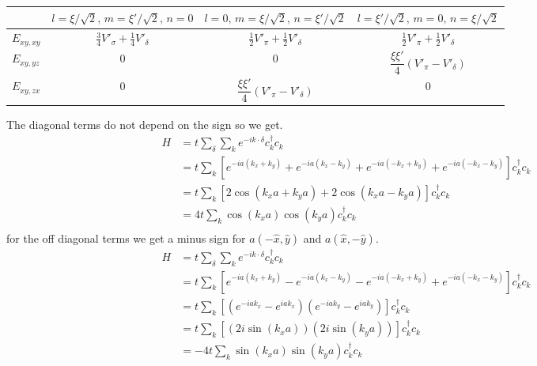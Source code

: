 \documentclass[11pt]{article}
\begin{document}
\begin{table}[h]
\centering
\begin{tabular}{lccc}
\toprule
 & $l=\xi/\sqrt{2},\,m=\xi'/\sqrt{2},\,n=0$
 & $l=0,\,m=\xi/\sqrt{2},\,n=\xi'/\sqrt{2}$
 & $l=\xi'/\sqrt{2},\,m=0,\,n=\xi/\sqrt{2}$ \\
\midrule
$E_{xy,xy}$ & $\tfrac{3}{4}V'_\sigma + \tfrac{1}{4}V'_\delta$
            & $\tfrac{1}{2}V'_\pi + \tfrac{1}{2}V'_\delta$
            & $\tfrac{1}{2}V'_\pi + \tfrac{1}{2}V'_\delta$ \\[6pt]
$E_{xy,yz}$ & $0$
            & $0$
            & $\dfrac{\xi\xi'}{4}\left(V'_\pi - V'_\delta\right)$ \\[8pt]
$E_{xy,zx}$ & $0$
            & $\dfrac{\xi\xi'}{4}\left(V'_\pi - V'_\delta\right)$
            & $0$ \\
\bottomrule
\end{tabular}
\end{table}

The diagonal terms do not depend on the sign so we get.
\begin{align}
    H &= t \sum_\delta \sum_k e^{-ik \cdot \delta} c_k^\dagger c_k \\\nonumber
    &= t \sum_k \left[e^{-ia(k_x+k_y)}+e^{-ia(k_x-k_y)}+e^{-ia(-k_x+k_y)} + e^{-ia(-k_x-k_y)}\right] c_k^\dagger c_k \\\nonumber
    &= t \sum_k \left[2\cos(k_xa + k_ya) + 2\cos(k_xa - k_ya)\right] c_k^\dagger c_k \\\nonumber
    &= 4t \sum_k \cos(k_x a)\cos(k_y a) c_k^\dagger c_k \\\nonumber
\end{align}
for the off diagonal terms we get a minus sign for $a(-\hat x, \hat y)$ and $a(\hat x, -\hat y)$.
\begin{align}
    H &= t \sum_\delta \sum_k e^{-ik \cdot \delta} c_k^\dagger c_k \\\nonumber
    &= t \sum_k \left[e^{-ia(k_x+k_y)}-e^{-ia(k_x-k_y)}-e^{-ia(-k_x+k_y)} + e^{-ia(-k_x-k_y)}\right] c_k^\dagger c_k \\\nonumber
    &= t \sum_k \left[(e^{-iak_x} - e^{iak_x})(e^{-iak_y}-e^{iak_y})\right] c_k^\dagger c_k \\\nonumber
    &= t \sum_k \left[(2i\sin(k_x a))(2i\sin(k_y a))\right] c_k^\dagger c_k \\\nonumber
    &= -4t \sum_k \sin(k_x a)\sin(k_y a) c_k^\dagger c_k \\\nonumber
\end{align}
\end{document}
